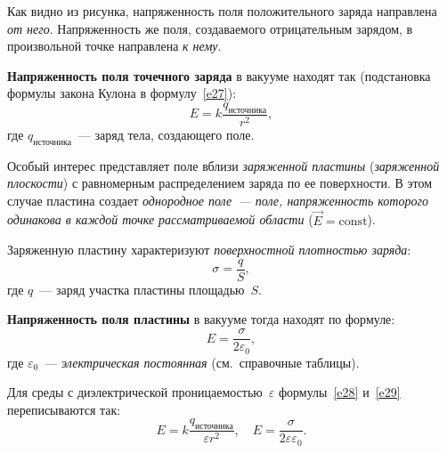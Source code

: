 \documentclass[main.tex]{subfiles}
\begin{document}
Как видно из рисунка, напряженность поля положительного заряда направлена \emph{от него}. 
Напряженность же поля, создаваемого отрицательным зарядом, в произвольной точке направлена \emph{к нему}.

\textbf{Напряженность поля точечного заряда} в вакууме находят так (подстановка формулы закона Кулона в формулу~\eqref{e27}):
\begin{equation}
    \label{e28}
    E=k\frac{q_\text{источника}}{r^2},
\end{equation}
где $q_\text{источника}$~--- заряд тела, создающего поле.

Особый интерес представляет поле вблизи \emph{заряженной пластины} (\emph{заряженной плоскости}) с равномерным распределением заряда по ее поверхности. В этом случае пластина создает \emph{однородное поле~--- поле, напряженность которого одинакова в каждой точке рассматриваемой области} ($\vec E=\mathrm{const}$).

Заряженную пластину характеризуют \emph{поверхностной плотностью заряда}:
\begin{equation}
    \sigma=\frac{q}{S},
\end{equation}
где $q$~--- заряд участка пластины площадью~$S$.

\textbf{Напряженность поля пластины} в вакууме тогда находят по формуле:
\begin{equation}
    \label{e29}
    E=\frac{\sigma}{2\varepsilon_0},
\end{equation}
где $\varepsilon_0$~--- \emph{электрическая постоянная} (см.~справочные таблицы).

Для среды с диэлектрической проницаемостью~$\varepsilon$ формулы~\eqref{e28} и~\eqref{e29} переписываются так:
\begin{equation*}
    E=k\frac{q_\text{источника}}{\varepsilon r^2},\quad E=\frac{\sigma}{2\varepsilon\varepsilon_0}. 
\end{equation*}













 
\end{document}
